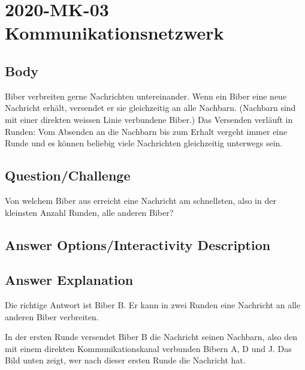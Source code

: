 \documentclass[a4paper,11pt]{report}
\newcommand{\taskGraphicsFolder}{..}
\begin{document}
\section*{\centering{} 2020-MK-03 Kommunikationsnetzwerk}


\subsection*{Body}

Biber verbreiten gerne Nachrichten untereinander. Wenn ein Biber eine neue Nachricht erhält, versendet er sie gleichzeitig an alle Nachbarn. (Nachbarn sind mit einer direkten weissen Linie verbundene Biber.) Das Versenden verläuft in Runden: Vom Absenden an die Nachbarn bis zum Erhalt vergeht immer eine Runde und es können beliebig viele Nachrichten gleichzeitig unterwegs sein.

{\em

\subsection*{Question/Challenge}

Von welchem Biber aus erreicht eine Nachricht am schnellsten, also in der kleinsten Anzahl Runden, alle anderen Biber?

{\centering%
\par}

}\begingroup
\renewcommand{\arraystretch}{1.5}
\subsection*{Answer Options/Interactivity Description}



\endgroup

\subsection*{Answer Explanation}

Die richtige Antwort ist Biber B. Er kann in zwei Runden eine Nachricht an alle anderen Biber verbreiten.

In der ersten Runde versendet Biber B die Nachricht seinen Nachbarn, also den mit einem direkten Kommunikationskanal verbunden Bibern A, D und J. Das Bild unten zeigt, wer nach dieser ersten Runde die Nachricht hat.

{\centering%
\par}
\end{document}

